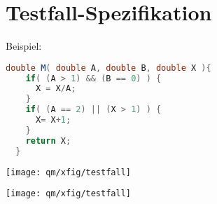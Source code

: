 \section{Testfall-Spezifikation}
Beispiel:
\begin{lstlisting}[language=java]
  double M( double A, double B, double X ){
    if( (A > 1) && (B == 0) ) {
      X = X/A;
    }
    if( (A == 2) || (X > 1) ) {
      X= X+1;
    }
    return X;
  }
\end{lstlisting}
\ifslides
\begin{center}
\texttt{[image: qm/xfig/testfall]}
\end{center}
\else
\texttt{[image: qm/xfig/testfall]}
\fi
\newpage
